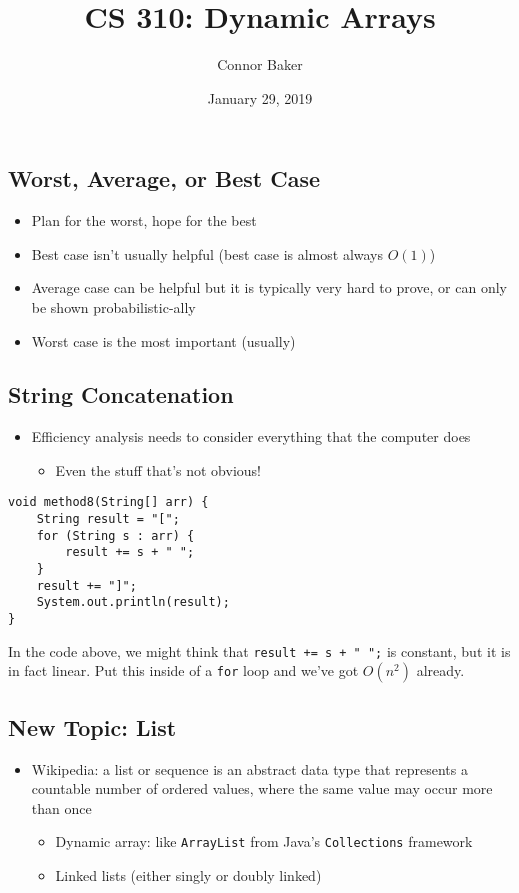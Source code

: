 \documentclass[10pt]{article}
\title{CS 310: Dynamic Arrays}
\author{Connor Baker}
\date{January 29, 2019}
\begin{document}
\maketitle

\subsection*{Worst, Average, or Best Case}
\begin{itemize}
    \item Plan for the worst, hope for the best
    \item Best case isn't usually helpful (best case is almost always $O(1)$)
    \item Average case can be helpful but it is typically very hard to prove, or can only be shown probabilistic-ally
    \item Worst case is the most important (usually)
\end{itemize}

\subsection*{String Concatenation}
\begin{itemize}
    \item Efficiency analysis needs to consider everything that the computer does
    \begin{itemize}
        \item Even the stuff that's not obvious!
    \end{itemize}
\end{itemize}

\begin{verbatim}
void method8(String[] arr) {
    String result = "[";
    for (String s : arr) {
        result += s + " ";
    }
    result += "]";
    System.out.println(result);
}
\end{verbatim}
In the code above, we might think that \texttt{result += s + " ";} is constant, but it is in fact linear. Put this inside of a \texttt{for} loop and we've got $O(n^2)$ already.


\subsection*{New Topic: List}
\begin{itemize}
    \item Wikipedia: a list or sequence is an abstract data type that represents a countable number of ordered values, where the same value may occur more than once
    \begin{itemize}
        \item Dynamic array: like \texttt{ArrayList} from Java's \texttt{Collections} framework
        \item Linked lists (either singly or doubly linked)
    \end{itemize}
\end{itemize}
\end{document}
